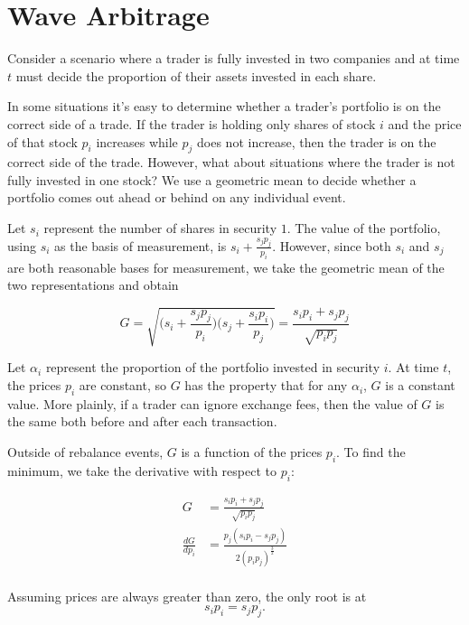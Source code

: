 \documentclass{article}
\begin{document}
\section{Wave Arbitrage}
Consider a scenario where a trader is fully invested in two companies and at
time $t$ must decide the proportion of their assets invested in each share.

In some situations it’s easy to determine whether a trader’s portfolio is on
the correct side of a trade. If the trader is holding only shares of stock $i$
and the price of that stock $p_i$ increases while $p_j$ does not increase,
then the trader is on the correct side of the trade. However, what about
situations where the trader is not fully invested in one stock? We use a
geometric mean to decide whether a portfolio comes out ahead or behind on any
individual event.

Let $s_i$ represent the number of shares in security $1$. The value of the
portfolio, using $s_i$ as the basis of measurement, is
$s_i + \frac{s_j p_j}{p_i}$. However, since both $s_i$ and $s_j$ are both
reasonable bases for measurement, we take the geometric mean of the two
representations and obtain

\begin{equation}
\label{G_definition}
  G = \sqrt{ \bigg( s_i + \frac{s_j p_j}{p_i} \bigg)
             \bigg( s_j + \frac{s_i p_i}{p_j} \bigg)
           }
    = \frac{s_i p_i + s_j p_j}{\sqrt{p_i p_j}}
\end{equation}

Let $\alpha_i$ represent the proportion of the portfolio invested in security
$i$. At time $t$, the prices $p_i$ are constant, so $G$ has the property that
for any $\alpha_i$, $G$ is a constant value. More plainly, if a trader can
ignore exchange fees, then the value of $G$ is the same both before and after
each transaction.

Outside of rebalance events, $G$ is a function of the prices $p_i$. To find the minimum, we take the derivative with respect to $p_i$:

\begin{equation}
\begin{aligned}
  G &= \frac{s_i p_i + s_j p_j}{\sqrt{p_i p_j}} \\
  \frac{dG}{dp_i} &= \frac{p_j (s_i p_i - s_j p_j)}{2 (p_i p_j)^{\frac{3}{2}}} \\
\end{aligned}
\end{equation}

Assuming prices are always greater than zero, the only root is at
\begin{equation}
\label{eq:balance}
  s_i p_i = s_j p_j .
\end{equation}
\end{document}
